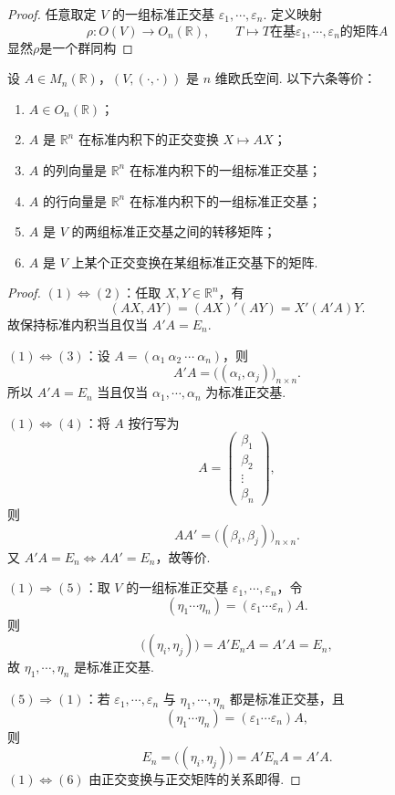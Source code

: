 \begin{proof}
	任意取定 $V$ 的一组标准正交基 $\varepsilon_1,
	\cdots,\varepsilon_n$. 定义映射
	\[
	\rho:O(V)\longrightarrow O_n(\mathbb{R}),
	\qquad
	T\longmapsto T\text{在基}\varepsilon_1,
		\cdots,\varepsilon_n\text{的矩阵}A
	\]
	显然$\rho$是一个群同构
\end{proof}

\begin{proposition}
	设 $A\in M_n(\mathbb{R})$，$(V,(\cdot,\cdot))$ 是 $n$ 维欧氏空间. 以下六条等价：
	\begin{enumerate}
		\item $A\in O_n(\mathbb{R})$；
		\item $A$ 是 $\mathbb{R}^n$ 在标准内积下的正交变换 $X\mapsto AX$；
		\item $A$ 的列向量是 $\mathbb{R}^n$ 在标准内积下的一组标准正交基；
		\item $A$ 的行向量是 $\mathbb{R}^n$ 在标准内积下的一组标准正交基；
		\item $A$ 是 $V$ 的两组标准正交基之间的转移矩阵；
		\item $A$ 是 $V$ 上某个正交变换在某组标准正交基下的矩阵.
	\end{enumerate}
\end{proposition}
\begin{proof}
	$(1)\Leftrightarrow(2)$：任取 $X,Y\in\mathbb{R}^n$，有
	\[
	(AX,AY)=(AX)'(AY)=X'(A'A)Y.
	\]
	故保持标准内积当且仅当 $A'A=E_n$.
	
	$(1)\Leftrightarrow(3)$：设 $A=(\alpha_1\ \alpha_2\ \cdots\ \alpha_n)$，则
	\[
	A'A=\bigl((\alpha_i,\alpha_j)\bigr)_{n\times n}.
	\]
	所以 $A'A=E_n$ 当且仅当 $\alpha_1,
	\cdots,\alpha_n$ 为标准正交基.
	
	$(1)\Leftrightarrow(4)$：将 $A$ 按行写为
	\[
	A=\begin{pmatrix}
		\beta_1\\
		\beta_2\\
		\vdots\\
		\beta_n
	\end{pmatrix},
	\]
	则
	\[
	AA'=\bigl((\beta_i,\beta_j)\bigr)_{n\times n}.
	\]
	又 $A'A=E_n\Longleftrightarrow AA'=E_n$，故等价.
	
	$(1)\Rightarrow(5)$：取 $V$ 的一组标准正交基 $\varepsilon_1,
	\cdots,\varepsilon_n$，令
	\[
	(\eta_1\cdots\eta_n)=(\varepsilon_1\cdots\varepsilon_n)A.
	\]
	则
	\[
	\bigl((\eta_i,\eta_j)\bigr)=A'E_nA=A'A=E_n,
	\]
	故 $\eta_1,
	\cdots,\eta_n$ 是标准正交基.
	
	$(5)\Rightarrow(1)$：若 $\varepsilon_1,
	\cdots,\varepsilon_n$ 与 $\eta_1,
	\cdots,\eta_n$ 都是标准正交基，且
	\[
	(\eta_1\cdots\eta_n)=(\varepsilon_1\cdots\varepsilon_n)A,
	\]
	则
	\[
	E_n=\bigl((\eta_i,\eta_j)\bigr)=A'E_nA=A'A.
	\]
	$(1)\Leftrightarrow(6)$ 由正交变换与正交矩阵的关系即得.
\end{proof}

